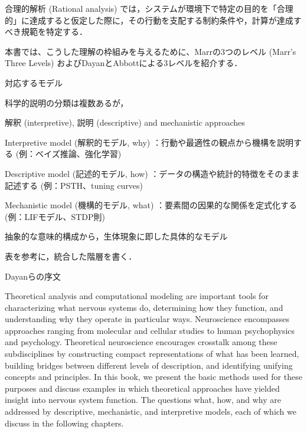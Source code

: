 \documentclass[titlepage]{ltjsbook}
\begin{document}
合理的解析 (Rational analysis) では，システムが環境下で特定の目的を「合理的」に達成すると仮定した際に，その行動を支配する制約条件や，計算が達成すべき規範を特定する．






本書では、こうした理解の枠組みを与えるために、Marrの3つのレベル (Marr's Three Levels)  \citep{Marr1982-wk} およびDayanとAbbottによる3レベルを紹介する．

対応するモデル

科学的説明の分類は複数あるが，

解釈 (interpretive), 説明 (descriptive)  and mechanistic approaches


Interpretive model (解釈的モデル, why) ：行動や最適性の観点から機構を説明する (例：ベイズ推論、強化学習) 

Descriptive model (記述的モデル, how) ：データの構造や統計的特徴をそのまま記述する (例：PSTH、tuning curves) 

Mechanistic model (機構的モデル, what) ：要素間の因果的な関係を定式化する (例：LIFモデル、STDP則) 

抽象的な意味的構成から，生体現象に即した具体的なモデル



表を参考に，統合した階層を書く．


%


Dayanらの序文

Theoretical analysis and computational modeling are important tools for characterizing what nervous systems do, determining how they function, and understanding why they operate in particular ways. Neuroscience encompasses approaches ranging from molecular and cellular studies to human psychophysics and psychology. Theoretical neuroscience encourages crosstalk among these subdisciplines by constructing compact representations of what has been learned, building bridges between different levels of description, and identifying unifying concepts and principles. In this book, we present the basic methods used for these purposes and discuss examples in which theoretical approaches have yielded insight into nervous system function. The questions what, how, and why are addressed by descriptive, mechanistic, and interpretive models, each of which we discuss in the following chapters. 
\end{document}
